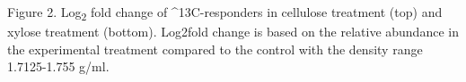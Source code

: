 Figure 2.  Log\textsubscript{2} fold change of ^{13}C-responders in cellulose treatment (top) and xylose treatment (bottom). Log2fold change is based on the relative abundance in the experimental treatment compared to the control with the density range 1.7125-1.755 g/ml.